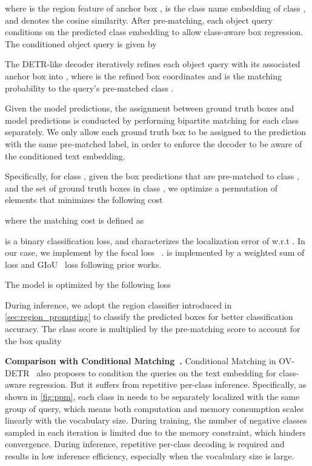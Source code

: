 \documentclass[10pt,twocolumn,letterpaper]{article}
\begin{document}
where  is the region feature of anchor box ,  is the class name embedding of class , and  denotes the cosine similarity.
After pre-matching, each object query conditions on the predicted class embedding to allow class-aware box regression. 
The conditioned object query is given by

The DETR-like decoder iteratively refines each object query with its associated anchor box  into , where  is the refined box coordinates and  is the matching probability to the query's pre-matched class .

Given the model predictions, the assignment between ground truth boxes and model predictions is conducted by performing bipartite matching for each class separately.
We only allow each ground truth box to be assigned to the prediction with the same pre-matched label, in order to enforce the decoder to be aware of the conditioned text embedding.


Specifically, for class , given the  box predictions  that are pre-matched to class , and the set of ground truth boxes  in class , we optimize a permutation of  elements  that minimizes the following cost

where the matching cost is defined as

 is a binary classification loss, and  characterizes the localization error of  w.r.t . 
In our case, we implement  by the focal loss ~\cite{focal}.  is implemented by a weighted sum of  loss and GIoU~\cite{giou} loss following prior works.

The model is optimized by the following loss


During inference, we adopt the region classifier introduced in \cref{sec:region_prompting} to classify the predicted boxes  for better classification accuracy. The class score is multiplied by the pre-matching score to account for the box quality



\noindent\textbf{Comparison with Conditional Matching~\cite{OVDETR}.} 
Conditional Matching in OV-DETR~\cite{OVDETR} also proposes to condition the queries on the text embedding for class-aware regression.
But it suffers from repetitive per-class inference.
Specifically, as shown in \cref{fig:ppm}, each class in  needs to be separately localized with the same group of query, which means both computation and memory consumption scales linearly with the vocabulary size.
During training, the number of negative classes sampled in each iteration is limited due to the memory constraint, which hinders convergence. 
During inference, repetitive per-class decoding is required and results in low inference efficiency, especially when the vocabulary size is large.
\end{document}
